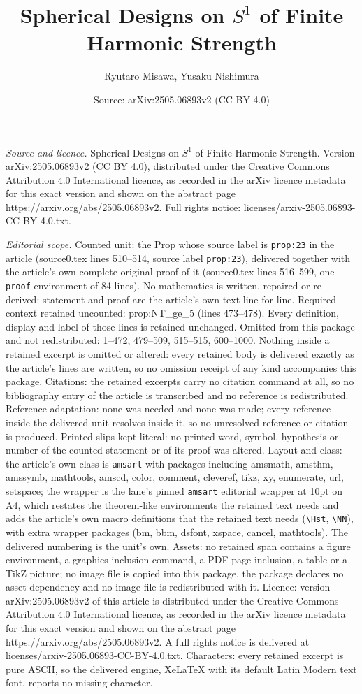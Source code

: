 \documentclass[10pt,a4paper]{amsart}
\title[Spherical Designs on $S^1$ of Finite Harmonic Strength]{Spherical Designs on $S^1$ of Finite Harmonic Strength}
\author{Ryutaro Misawa, Yusaku Nishimura}
\date{Source: arXiv:2505.06893v2 (CC BY 4.0)}
\begin{document}
\maketitle

\noindent\emph{Source and licence.} Spherical Designs on $S^1$ of Finite Harmonic Strength. Version arXiv:2505.06893v2 (CC BY 4.0), distributed under the Creative Commons Attribution 4.0 International licence, as recorded in the arXiv licence metadata for this exact version and shown on the abstract page https://arxiv.org/abs/2505.06893v2. Full rights notice: licenses/arxiv-2505.06893-CC-BY-4.0.txt.\par\smallskip

\noindent\textit{Editorial scope.} Counted unit: the Prop whose source label is \texttt{prop:23} in the article (source0.tex lines 510--514, source label \texttt{prop:23}), delivered together with the article's own complete original proof of it (source0.tex lines 516--599, one \texttt{proof} environment of 84 lines). No mathematics is written, repaired or re-derived: statement and proof are the article's own text line for line. Required context retained uncounted: prop:NT\_ge\_5 (lines 473--478). Every definition, display and label of those lines is retained unchanged. Omitted from this package and not redistributed: 1--472, 479--509, 515--515, 600--1000. Nothing inside a retained excerpt is omitted or altered: every retained body is delivered exactly as the article's lines are written, so no omission receipt of any kind accompanies this package. Citations: the retained excerpts carry no citation command at all, so no bibliography entry of the article is transcribed and no reference is redistributed. Reference adaptation: none was needed and none was made; every reference inside the delivered unit resolves inside it, so no unresolved reference or citation is produced. Printed slips kept literal: no printed word, symbol, hypothesis or number of the counted statement or of its proof was altered. Layout and class: the article's own class is \texttt{amsart} with packages including amsmath, amsthm, amssymb, mathtools, amscd, color, comment, cleveref, tikz, xy, enumerate, url, setspace; the wrapper is the lane's pinned \texttt{amsart} editorial wrapper at 10pt on A4, which restates the theorem-like environments the retained text needs and adds the article's own macro definitions that the retained text needs (\texttt{\textbackslash Hst}, \texttt{\textbackslash NN}), with extra wrapper packages (bm, bbm, dsfont, xspace, cancel, mathtools). The delivered numbering is the unit's own. Assets: no retained span contains a figure environment, a graphics-inclusion command, a PDF-page inclusion, a table or a TikZ picture; no image file is copied into this package, the package declares no asset dependency and no image file is redistributed with it. Licence: version arXiv:2505.06893v2 of this article is distributed under the Creative Commons Attribution 4.0 International licence, as recorded in the arXiv licence metadata for this exact version and shown on the abstract page https://arxiv.org/abs/2505.06893v2. A full rights notice is delivered at licenses/arxiv-2505.06893-CC-BY-4.0.txt. Characters: every retained excerpt is pure ASCII, so the delivered engine, XeLaTeX with its default Latin Modern text font, reports no missing character.
\end{document}

